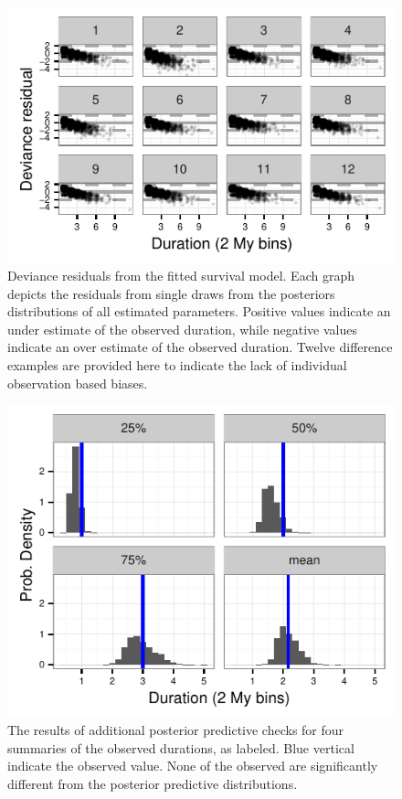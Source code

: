 \documentclass{article}
\begin{document}
\begin{figure}[ht]
  \centering
  \includegraphics[height = 0.5\textheight, width = \textwidth, keepaspectratio = true]{figure/residual_plot}
  \caption{Deviance residuals from the fitted survival model. Each graph depicts the residuals from single draws from the posteriors distributions of all estimated parameters. Positive values indicate an under estimate of the observed duration, while negative values indicate an over estimate of the observed duration. Twelve difference examples are provided here to indicate the lack of individual observation based biases.}
  \label{fig:ppc_res}
\end{figure}

\begin{figure}[ht]
  \centering
  \includegraphics[height = 0.5\textheight, width = \textwidth, keepaspectratio = true]{figure/quant_ppc}
  \caption{The results of additional posterior predictive checks for four summaries of the observed durations, as labeled. Blue vertical indicate the observed value. None of the observed are significantly different from the posterior predictive distributions.}
  \label{fig:ppc_quant}
\end{figure}
\end{document}
